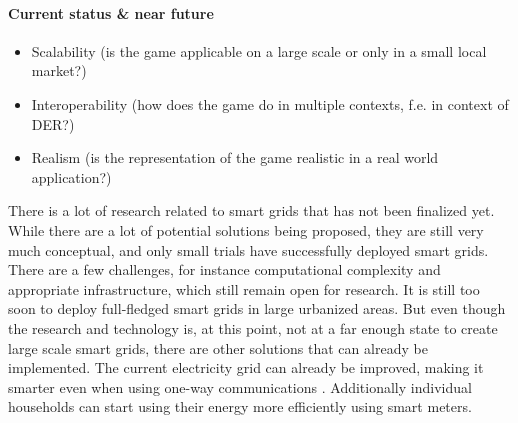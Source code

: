 \paragraph{Current status \& near future}


\begin{itemize}
	\item Scalability (is the game applicable on a large scale or only in a small local market?)
	\item Interoperability (how does the game do in multiple contexts, f.e. in context of DER?)
	\item Realism (is the representation of the game realistic in a real world application?)
\end{itemize}




There is a lot of research related to smart grids that has not been finalized yet. While there are a lot of potential solutions being proposed, they are still very much conceptual, and only small trials have successfully deployed smart grids. There are a few challenges, for instance computational complexity and appropriate infrastructure, which still remain open for research. It is still too soon to deploy full-fledged smart grids in large urbanized areas.
But even though the research and technology is, at this point, not at a far enough state to create large scale smart grids, there are other solutions that can already be implemented. The current electricity grid can already be improved, making it smarter even when using one-way communications \cite{Alamaniotis2010}. Additionally individual households can start using their energy more efficiently using smart meters.


